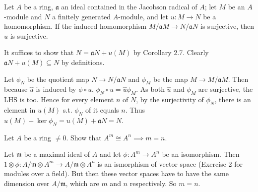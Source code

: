 \documentclass[a4paper]{exam}
\newif\ifhint
\begin{document}
\begin{questions}
	\question Let $A $ be a ring, $\mathfrak{a}$ an ideal contained in the Jacobson radical of $A $; let $M $ be an $A $-module and $N $ a finitely generated $A$-module, and let $u: M\to N $ be a homomorphism. If the induced homomorphism $M / \mathfrak{a}M \to N / \mathfrak{a}N $ is surjective, then $u $ is surjective.
	\begin{solution}
		It suffices to show that $N = \mathfrak{a}N + u(M) $ by Corollary 2.7.
		Clearly $\mathfrak{a}N + u(M) \subseteq N$ by definitions.

		Let $\phi_N$ be the quotient map $N\to N / \mathfrak{a}N $ and $\phi_M $ be the map $M \to M / \mathfrak{a}M $.
		Then because $\hat{u}  $ is induced by $\phi \circ u $, $\phi_N \circ u = \hat{u}\phi_M  $.
		As both $\hat{u}  $ and $\phi _M $ are surjective, the LHS is too.
		Hence for every element $n $ of $N $, by the surjectivity of $\phi_N $, there is an element in $u(M) $ s.t. $\phi _N $ of it equals $n $.
		Thus $u(M) + \ker \phi _N = u(M) + \mathfrak{a}N = N$.
	\end{solution}

	\question Let $A $ be a ring $\ne 0 $. Show that $A^m \cong A^n \implies m = n $.
	\ifhint
		Let $\mathfrak{m} $ be a maximal ideal of $A $ and let $\phi : A^m \to A^n $ be an isomorphism.
		Then $1 \otimes \phi: A / \mathfrak{m} \otimes A^m \to A / \mathfrak{m} \otimes A^n$ is an ismorphism of vector space of dimensions $m $ and $n $ over the field $k= A / \mathfrak{m} $.
		Hece $m=n $. [Cf. Chapter 3, Exercise 15]
	\fi
	\begin{solution}
		Let $\mathfrak{m} $ be a maximal ideal of $A $ and let $\phi : A^m \to A^n $ be an isomorphism.
		Then $1 \otimes \phi: A / \mathfrak{m} \otimes A^m \to A / \mathfrak{m} \otimes A^n$ is an ismorphism of vector space (Exercise 2 for modules over a field).
		But then these vector spaces have to have the same dimension over $A / \mathfrak{m} $, which are $m $ and $n $ respectively.
		So $m=n $.
	\end{solution}
\end{questions}
\end{document}
